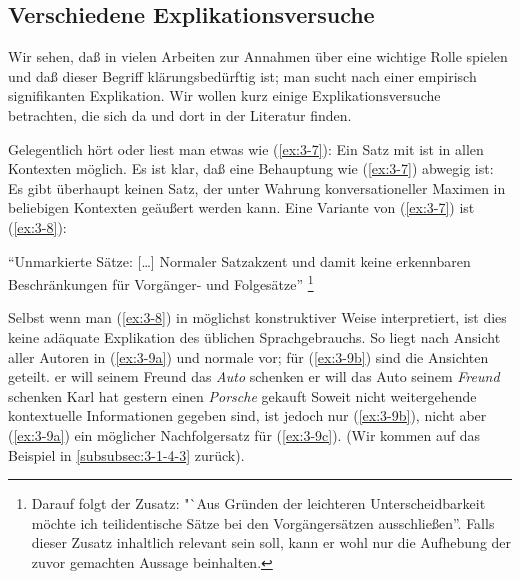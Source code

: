 \documentclass[output=paper]{langsci/langscibook}
\begin{document}
\subsection{Verschiedene Explikationsversuche}
\label{subsec:3-1-2}

Wir sehen, daß in vielen Arbeiten zur  Annahmen über  eine wichtige Rolle spielen und daß dieser Begriff klärungsbedürftig ist; man sucht nach einer empirisch signifikanten Explikation. Wir wollen kurz einige Explikationsversuche betrachten, die sich da und dort in der Literatur finden.

Gelegentlich hört oder liest man etwas wie (\ref{ex:3-7}):
\ea
\label{ex:3-7}
Ein Satz mit  ist in allen Kontexten möglich.
\z
Es ist klar, daß eine Behauptung wie (\ref{ex:3-7}) abwegig ist: Es gibt
überhaupt keinen Satz, der unter Wahrung konversationeller Maximen in beliebigen Kontexten geäußert werden kann. Eine Variante von (\ref{ex:3-7})
ist (\ref{ex:3-8}):
\begin{exe}
\ex \label{ex:3-8}
"`Unmarkierte Sätze: [\ldots{}] Normaler Satzakzent und damit keine
erkennbaren Beschränkungen für Vorgänger- und Folgesätze"'
\citep[38]{Altmann76}\footnote{\label{fn:3-1}%
	Darauf folgt der Zusatz: "`Aus Gründen der leichteren
  Unterscheidbarkeit möchte ich teilidentische Sätze bei den Vorgängersätzen ausschließen''. Falls
  dieser Zusatz inhaltlich relevant sein soll, kann er wohl nur die Aufhebung der zuvor gemachten
  Aussage beinhalten.%
} 
\end{exe}
Selbst wenn man (\ref{ex:3-8}) in möglichst konstruktiver Weise interpretiert,
ist dies keine adäquate Explikation des üblichen Sprachgebrauchs. So
liegt nach Ansicht aller Autoren in (\ref{ex:3-9a})  und normale
 vor; für (\ref{ex:3-9b}) sind die Ansichten geteilt.
\eal \label{ex:3-9}
\ex
\label{ex:3-9a}
er will seinem Freund das \textit{Auto} schenken
\ex
\label{ex:3-9b}
er will das Auto seinem \textit{Freund} schenken
\ex
\label{ex:3-9c}
Karl hat gestern einen \textit{Porsche} gekauft
\zl
Soweit nicht weitergehende kontextuelle Informationen gegeben sind,
ist jedoch nur (\ref{ex:3-9b}), nicht aber (\ref{ex:3-9a}) ein möglicher Nachfolgersatz
für (\ref{ex:3-9c}). (Wir kommen auf das Beispiel in \ref{subsubsec:3-1-4-3} zurück).
\end{document}
